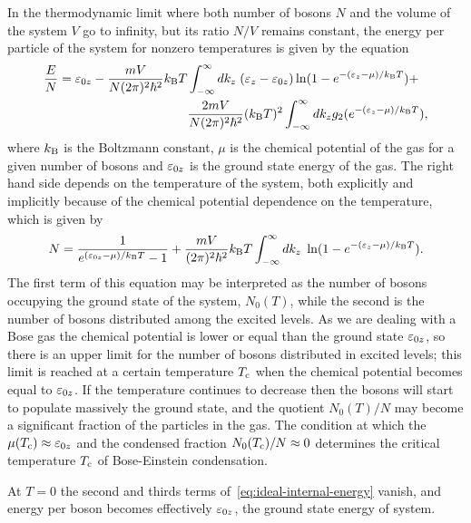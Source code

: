 In the thermodynamic limit where both number of bosons $N$ and the volume of
the system $V$ go to infinity, but its ratio $N / V$ remains constant, the
energy per particle of the system for nonzero temperatures is given by the
equation
\cite{bib:rodriguez-msc-thesis.2014}
%
\begin{align}
  \label{eq:ideal-internal-energy}
  \nonumber \frac{E}{N} = \ez[0] - \frac{m V}{N (2\pi)^2 \hbar^2} \kbz T & \int_{-\infty}^{\infty} d\kz \; (\ez - \ez[0]) \ln(1 - e^{-(\ez - \mu) / \kbz T}) +                    \\
                                                                         & \frac{2 m V}{N (2\pi)^2 \hbar^2} (\kbz T)^2 \int_{-\infty}^{\infty} d\kz g_2(e^{-(\ez - \mu)/\kbz T}),
\end{align}
%
where $\kbz$ is the Boltzmann constant, $\mu$ is the chemical potential of the
gas for a given number of bosons and $\ez[0]$ is the ground state energy of the
gas. The right hand side depends on the temperature of the system, both
explicitly and implicitly because of the chemical potential dependence on the
temperature, which is given by
%
\begin{equation}
  \label{eq:ideal-number-of-bosons}
  N = \frac{1}{e^{(\ez[0] - \mu)/\kbz T} - 1} + \frac{m V}{(2\pi)^2 \hbar^2} \kbz T \int_{-\infty}^{\infty} d\kz \; \ln(1 - e^{-(\ez - \mu)/\kbz T}).
\end{equation}
%
The first term of this equation may be interpreted as the number of bosons
occupying the ground state of the system, $N_0(T)$, while the second is the
number of bosons distributed among the excited levels. As we are dealing with a
Bose gas the chemical potential is lower or equal than the ground state
$\ez[0]$, so there is an upper limit for the number of bosons distributed in
excited levels; this limit is reached at a certain temperature $\Tcritic$ when
the chemical potential becomes equal to $\ez[0]$. If the temperature continues
to decrease then the bosons will start to populate massively the ground state,
and the quotient $N_0(T) / N$ may become a significant fraction of the particles
in the gas. The condition at which the $\mu(\Tcritic) \approx \ez[0]$ and the
condensed fraction $N_0(\Tcritic) / N \approx 0$ determines the critical
temperature $\Tcritic$ of Bose-Einstein condensation.

At $T = 0$ the second and thirds terms of~\eqref{eq:ideal-internal-energy}
vanish, and energy per boson becomes effectively $\ez[0]$, the ground state
energy of system.


